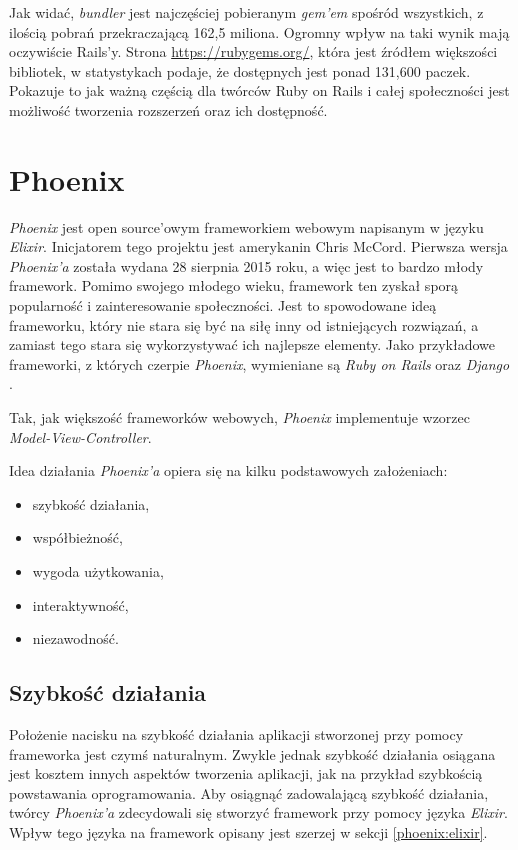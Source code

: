 \documentclass[mgr,oneside]{mgr}
\begin{document}
Jak widać, \textit{bundler} jest najczęściej pobieranym \textit{gem'em} spośród wszystkich, z ilością pobrań przekraczającą 162,5 miliona. Ogromny wpływ na taki wynik mają oczywiście Rails'y. Strona \url{https://rubygems.org/}, która jest źródłem większości bibliotek, w statystykach podaje, że dostępnych jest ponad 131,600 paczek. Pokazuje to jak ważną częścią dla twórców Ruby on Rails i całej społeczności jest możliwość tworzenia rozszerzeń oraz ich dostępność.

\section{Phoenix} %

\textit{Phoenix} jest open source'owym frameworkiem webowym napisanym w języku \textit{Elixir}. Inicjatorem tego projektu jest amerykanin Chris McCord. Pierwsza wersja \textit{Phoenix'a} została wydana 28 sierpnia 2015 roku, a więc jest to bardzo młody framework. Pomimo swojego młodego wieku, framework ten zyskał sporą popularność i zainteresowanie społeczności. Jest to spowodowane ideą frameworku, który nie stara się być na siłę inny od istniejących rozwiązań, a zamiast tego stara się wykorzystywać ich najlepsze elementy. Jako przykładowe frameworki, z których czerpie \textit{Phoenix}, wymieniane są \textit{Ruby on Rails} oraz \textit{Django} \cite{phoenix_docs}.

Tak, jak większość frameworków webowych, \textit{Phoenix} implementuje wzorzec \textit{Model-View-Controller}.

Idea działania \textit{Phoenix'a} opiera się na kilku podstawowych założeniach:
\begin{itemize}
  \item szybkość działania,
  \item współbieżność,
  \item wygoda użytkowania,
  \item interaktywność,
  \item niezawodność.
\end{itemize}

\subsection{Szybkość działania}
Położenie nacisku na szybkość działania aplikacji stworzonej przy pomocy frameworka jest czymś naturalnym. Zwykle jednak szybkość działania osiągana jest kosztem innych aspektów tworzenia aplikacji, jak na przykład szybkością powstawania oprogramowania. Aby osiągnąć zadowalającą szybkość działania, twórcy \textit{Phoenix'a} zdecydowali się stworzyć framework przy pomocy języka \textit{Elixir}. Wpływ tego języka na framework opisany jest szerzej w sekcji \ref{phoenix:elixir}.
\end{document}
